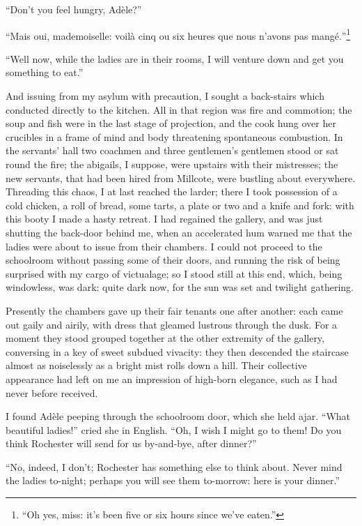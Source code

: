 \enquote{Don't you feel hungry, Adèle?}

\foreignquote{french}{Mais oui, mademoiselle: voilà cinq ou six heures que nous
	n'avons pas mangé.}\footnote{\enquote{Oh yes, miss: it's been five or six hours since we've eaten.}}

\enquote{Well now, while the ladies are in their rooms, I will venture
	down and get you something to eat.}

And issuing from my asylum with precaution, I sought a back-stairs which
conducted directly to the kitchen. All in that region was fire and
commotion; the soup and fish were in the last stage of projection, and
the cook hung over her crucibles in a frame of mind and body threatening
spontaneous combustion. In the servants' hall two coachmen and three
gentlemen's gentlemen stood or sat round the fire; the abigails, I
suppose, were upstairs with their mistresses; the new servants, that had
been hired from Millcote, were bustling about everywhere. Threading
this chaos, I at last reached the larder; there I took possession of a
cold chicken, a roll of bread, some tarts, a plate or two and a knife
and fork: with this booty I made a hasty retreat. I had regained the
gallery, and was just shutting the back-door behind me, when an
accelerated hum warned me that the ladies were about to issue from their
chambers. I could not proceed to the schoolroom without passing some of
their doors, and running the risk of being surprised with my cargo of
victualage; so I stood still at this end, which, being windowless, was
dark: quite dark now, for the sun was set and twilight gathering.

Presently the chambers gave up their fair tenants one after another:
each came out gaily and airily, with dress that gleamed lustrous through
the dusk. For a moment they stood grouped together at the other
extremity of the gallery, conversing in a key of sweet subdued vivacity:
they then descended the staircase almost as noiselessly as a bright mist
rolls down a hill. Their collective appearance had left on me an
impression of high-born elegance, such as I had never before received.

I found Adèle peeping through the schoolroom door, which she held ajar.
\enquote{What beautiful ladies!} cried she in English. \enquote{Oh, I
	wish I might go to them! Do you think \Mr{} Rochester will send for us
	by-and-bye, after dinner?}

\enquote{No, indeed, I don't; \Mr{} Rochester has something else to think
	about. Never mind the ladies to-night; perhaps you will see them
	to-morrow: here is your dinner.}


